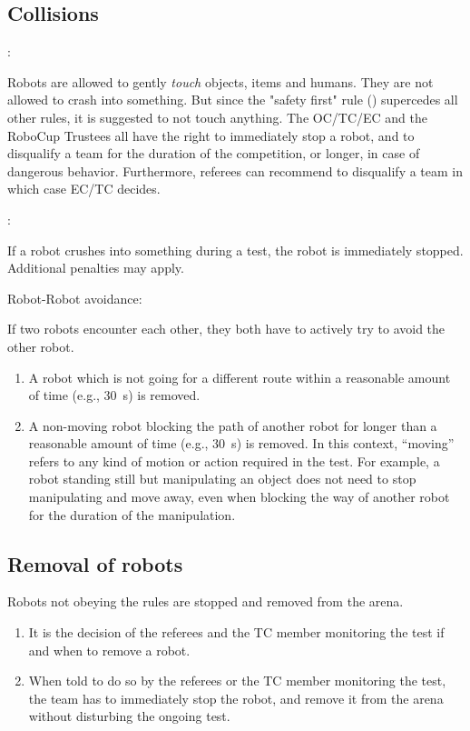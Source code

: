 \subsection{Collisions}
\begin{enumerate}
  {\bf\item {}:} Robots are allowed to gently \emph{touch} objects, items and humans. 
  They are not allowed to crash into something. 
  But since the "safety first" rule () supercedes all other rules, it is suggested to not touch anything.
  The OC/TC/EC and the RoboCup Trustees all have the right to immediately stop a robot, and to disqualify a team for the 
  duration of the competition, or longer, in case of dangerous behavior. 
  Furthermore, referees can recommend to disqualify a team in which case EC/TC decides.
  {\bf\item {}:} If a robot crushes into something during a test, the robot is immediately stopped.
  Additional penalties may apply. 
  {\bf\item Robot-Robot avoidance:} If two robots encounter each other, they both have to actively try to avoid the other robot.
  \begin{enumerate}
  \item A robot which is not going for a different route 
    within a reasonable amount of time (e.g., \SI{30}{\second}) is removed.
  \item A non-moving robot blocking the path of another robot 
    for longer than a reasonable amount of time (e.g., \SI{30}{\second}) is removed.
    In this context, ``moving'' refers to any kind of motion or action required in the test. 
    For example, a robot standing still but manipulating an object does 
    not need to stop manipulating and move away, even when blocking the way
    of another robot for the duration of the manipulation.
  \end{enumerate}
\end{enumerate}



\subsection{Removal of robots}\label{rule:robot_removal}
Robots not obeying the rules are stopped and removed from the arena.
\begin{enumerate}
\item It is the decision of the referees and the TC member monitoring the test if and when to remove a robot.
\item When told to do so by the referees or the TC member monitoring the test, the team has to immediately stop the robot,
  and remove it from the arena without disturbing the ongoing test.
\end{enumerate}


